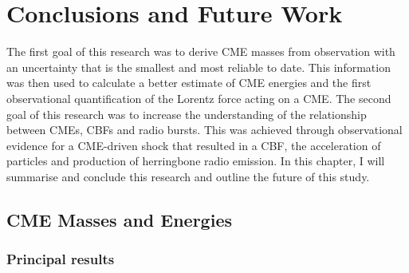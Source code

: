 
\singlespacing
\chapter{Conclusions and Future Work} 

\label{chap:6}

\doublespacing
The first goal of this research was to derive CME masses from observation with an uncertainty that is the smallest and most reliable to date. This information was then used to calculate a better estimate of CME energies and the first observational quantification of the Lorentz force acting on a CME. 
The second goal of this research was to increase the understanding of the relationship between CMEs, CBFs and radio bursts. This was achieved through observational evidence for a CME-driven shock that resulted in a CBF, the acceleration of particles and production of herringbone radio emission. In this chapter, I will summarise and conclude this research and outline the future of this study.
\clearpage

\section{CME Masses and Energies}

\subsection{Principal results}

